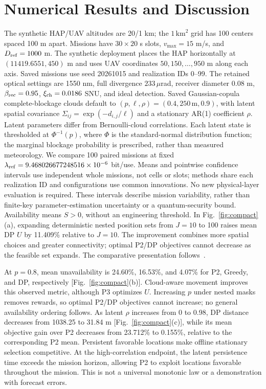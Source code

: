 \section{Numerical Results and Discussion}
\label{sec:numerical}
The synthetic HAP/UAV altitudes are 20/1 km; the $1\,\mathrm{km}^2$ grid
has 100 centers spaced 100 m apart. Missions have $30\times20$ s slots,
$v_{\max}=15$ m/s, and $D_{\rm ref}=1000$ m. The synthetic deployment
places the HAP horizontally at $(11419.6551,450)$ m and uses UAV
coordinates $50,150,\ldots,950$ m along each axis. Saved missions use
seed 20261015 and realization IDs 0--99. The retained optical settings
are 1550 nm, full divergence $233\,\mu$rad, receiver diameter 0.08 m,
$\beta_{\rm rec}=0.95$, $\xi_{\rm ch}=0.0186$ SNU, and ideal detection.
Saved Gaussian-copula complete-blockage clouds default to
$(p,\ell,\rho)=(0.4,250\,\mathrm m,0.9)$, with latent spatial covariance
$\Sigma_{ij}=\exp(-d_{i,j}/\ell)$ and a stationary AR(1) coefficient
$\rho$. Latent parameters differ from Bernoulli-cloud correlations.
Each latent state is thresholded at $\Phi^{-1}(p)$, where $\Phi$ is the
standard-normal distribution function; the marginal blockage probability
is prescribed, rather than measured meteorology.
We compare 100 paired missions
at fixed $\lambda_{\rm ref}=9.468026677248516\times10^{-6}$ bit/use.
Means and pointwise confidence intervals use independent whole missions,
not cells or slots; methods share each realization ID and configurations
use common innovations. No new physical-layer evaluation is required.
These intervals describe mission variability, rather than finite-key
parameter-estimation uncertainty or a quantum-security bound.
Availability means $S>0$, without an engineering threshold. In
Fig.~\ref{fig:compact}(a), expanding deterministic nested position sets
from $J=10$ to 100 raises mean DP $U$ by 11.409\% relative to $J=10$.
The improvement combines more spatial choices and greater connectivity;
optimal P2/DP objectives cannot decrease as the feasible set expands.
The comparative presentation follows~\cite{gong2020}.

At $p=0.8$, mean unavailability is 24.60\%, 16.53\%, and 4.07\% for
P2, Greedy, and DP, respectively [Fig.~\ref{fig:compact}(b)]. Cloud-aware
movement improves this observed metric, although P3 optimizes $U$.
Increasing $p$ under nested masks removes rewards, so optimal P2/DP
objectives cannot increase; no general availability ordering follows.
As latent $\rho$ increases from 0 to 0.98, DP distance decreases from
1038.25 to 31.84 m [Fig.~\ref{fig:compact}(c)], while its mean objective
gain over P2 decreases from 23.712\% to 0.155\%, relative to the
corresponding P2 mean. Persistent favorable locations make offline
stationary selection competitive. At the high-correlation endpoint, the
latent persistence time exceeds the mission horizon, allowing P2 to exploit
locations favorable throughout the mission. This is not a universal
monotonic law or a demonstration with forecast errors.

